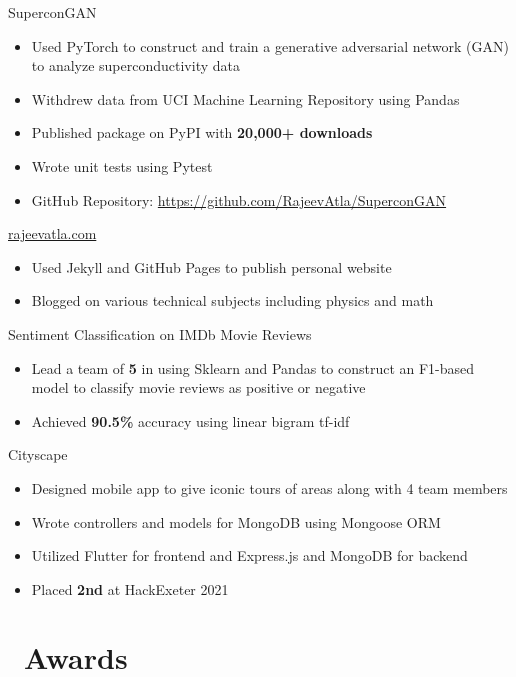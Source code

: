 \documentclass[12]{article}
\begin{document}
{SuperconGAN}
{
  \begin{itemize}
  \item Used PyTorch to construct and train a generative adversarial network (GAN) to analyze superconductivity data
  \item Withdrew data from UCI Machine Learning Repository using Pandas
  \item Published package on PyPI with \textbf{20,000+ downloads}
  \item Wrote unit tests using Pytest
  \item GitHub Repository: \url{https://github.com/RajeevAtla/SuperconGAN}
  \end{itemize}
}
\vspace{-1\baselineskip}
{\url{rajeevatla.com}}
{
  \begin{itemize}
  \item Used Jekyll and GitHub Pages to publish personal website
  \item Blogged on various technical subjects including physics and math
  \end{itemize}
}
\vspace{-1\baselineskip}
{Sentiment Classification on IMDb Movie Reviews}
{
  \begin{itemize}
  \item Lead a team of \textbf{5} in using Sklearn and Pandas to construct an F1-based model to classify movie reviews as positive or negative
  \item Achieved \textbf{90.5\%} accuracy using linear bigram tf-idf
  \end{itemize}
}
\vspace{-1\baselineskip}
{Cityscape}
{
  \begin{itemize}
  \item Designed mobile app to give iconic tours of areas along with 4 team members
  \item Wrote controllers and models for MongoDB using Mongoose ORM
  \item Utilized Flutter for frontend and Express.js and MongoDB for backend
  \item Placed \textbf{2nd} at HackExeter 2021
  \end{itemize}
}
\vspace{-1\baselineskip}

\section{\faAward\ Awards}
\end{document}
